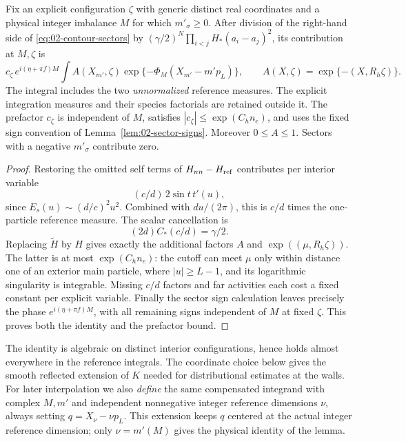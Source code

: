 \begin{lemma}\label{lem:03-compensated-sector}
Fix an explicit configuration \(\zeta\) with generic distinct real coordinates and a physical integer imbalance \(M\) for which \(m'_\sigma\ge0\). After division of the right-hand side of \eqref{eq:02-contour-sectors} by
\((\gamma/2)^N\prod_{i<j}H_*(a_i-a_j)^2\), its contribution at \(M,\zeta\) is
\[
 c_\zeta\,e^{i(\eta+\pi f)M}
 \int A(X_{m'},\zeta)\exp\{-\Phi_M(X_{m'}-m'p_L)\},
 \qquad A(X,\zeta)=\exp\{-(X,R_h\zeta)\}.
\]
The integral includes the two \emph{unnormalized} reference measures. The explicit integration measures and their species factorials are retained outside it. The prefactor \(c_\zeta\) is independent of \(M\), satisfies \(|c_\zeta|\le\exp(C_hn_e)\), and uses the fixed sign convention of Lemma~\ref{lem:02-sector-signs}. Moreover \(0\le A\le1\). Sectors with a negative \(m'_\sigma\) contribute zero.
\end{lemma}
\begin{proof}
Restoring the omitted self terms of \(H_{nn}-H_{\rm ref}\) contributes per interior variable
\[
 (c/d)\,2\sin t\,t'(u),
\]
since \(E_s(u)\sim(d/c)^2u^2\). Combined with \(du/(2\pi)\), this is \(c/d\) times the one-particle reference measure. The scalar cancellation is
\[
 (2d)C_*(c/d)=\gamma/2.
\]
Replacing \(\widetilde H\) by \(H\) gives exactly the additional factors \(A\) and \(\exp((\mu,R_h\zeta))\). The latter is at most \(\exp(C_hn_e)\): the cutoff can meet \(\mu\) only within distance one of an exterior main particle, where \(|u|\ge L-1\), and its logarithmic singularity is integrable. Missing \(c/d\) factors and far activities each cost a fixed constant per explicit variable. Finally the sector sign calculation leaves precisely the phase \(e^{i(\eta+\pi f)M}\), with all remaining signs independent of \(M\) at fixed \(\zeta\). This proves both the identity and the prefactor bound.
\end{proof}

The identity is algebraic on distinct interior configurations, hence holds almost everywhere in the reference integrals. The coordinate choice below gives the smooth reflected extension of \(K\) needed for distributional estimates at the walls. For later interpolation we also \emph{define} the same compensated integrand with complex \(M,m'\) and independent nonnegative integer reference dimensions \(\nu\), always setting \(q=X_\nu-\nu p_L\). This extension keeps \(q\) centered at the actual integer reference dimension; only \(\nu=m'(M)\) gives the physical identity of the lemma.

